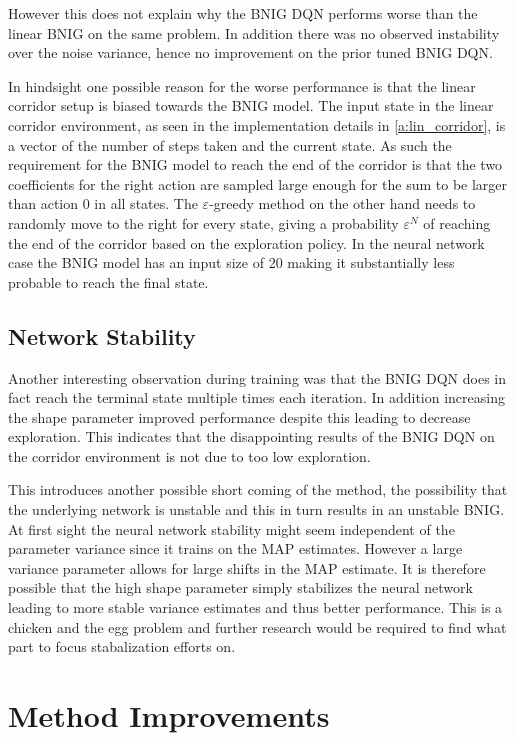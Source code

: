 However this does not explain why the BNIG DQN performs worse than the linear BNIG on the same problem. In addition there was no observed instability over the noise variance, hence no improvement on the prior tuned BNIG DQN.

In hindsight one possible reason for the worse performance is that the linear corridor setup is biased towards the BNIG model. The input state in the linear corridor environment, as seen in the implementation details in \ref{a:lin_corridor}, is a vector of the number of steps taken and the current state. As such the requirement for the BNIG model to reach the end of the corridor is that the two coefficients for the right action are sampled large enough for the sum to be larger than action 0 in all states. The $\varepsilon$-greedy method on the other hand needs to randomly move to the right for every state, giving a probability $\varepsilon^N$ of reaching the end of the corridor based on the exploration policy. In the neural network case the BNIG model has an input size of 20 making it substantially less probable to reach the final state.

\subsection{Network Stability}

Another interesting observation during training was that the BNIG DQN does in fact reach the terminal state multiple times each iteration. In addition increasing the shape parameter improved performance despite this leading to decrease exploration. This indicates that the disappointing results of the BNIG DQN on the corridor environment is not due to too low exploration. 

This introduces another possible short coming of the method, the possibility that the underlying network is unstable and this in turn results in an unstable BNIG. At first sight the neural network stability might seem independent of the parameter variance since it trains on the MAP estimates. However a large variance parameter allows for large shifts in the MAP estimate. It is therefore possible that the high shape parameter simply stabilizes the neural network leading to more stable variance estimates and thus better performance. This is a chicken and the egg problem and further research would be required to find what part to focus stabalization efforts on.

\section{Method Improvements}

